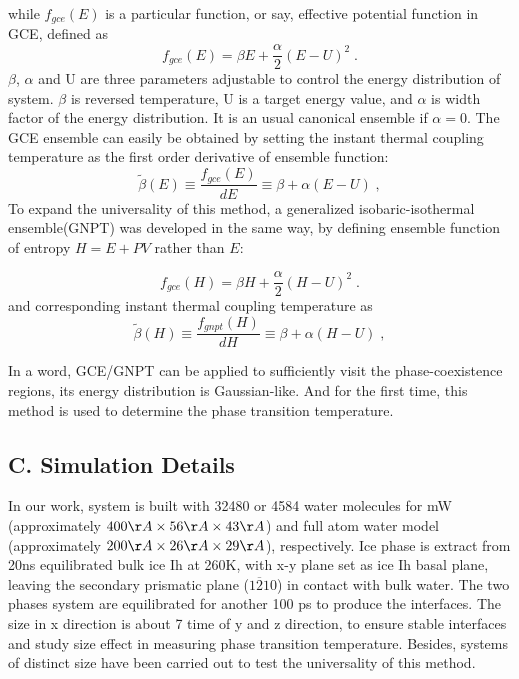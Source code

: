 \documentclass[aps,prl,twocolumn,superscriptaddress]{revtex4-1}
\begin{document}
while $f_{gce}(E)$ is a particular function, or say, effective potential function in GCE, defined as
\begin{equation}
f_{gce}(E)=\beta E+ \frac{\alpha}{2}(E−U)^2\;.
\end{equation}
$\beta$, $\alpha$ and U are three parameters adjustable to control the energy distribution of system. $\beta$ is reversed temperature, U is a target energy value, and $\alpha$  is width factor of the energy distribution. It is an usual canonical ensemble if $\alpha=0$. The GCE ensemble can easily be obtained by setting the instant thermal coupling temperature as the first order derivative of ensemble function:
\begin{equation}
\widetilde{\beta}(E)≡\frac{f_{gce}(E)}{dE}≡\beta+\alpha(E−U)\;,
\end{equation}
To expand the universality of this method, a generalized isobaric-isothermal ensemble(GNPT) was developed in the same way, by defining ensemble function of entropy $H=E+PV$ rather than $E$:

\begin{equation}
f_{gce}(H)=\beta H+ \frac{\alpha}{2}(H−U)^2\;.
\end{equation}
and corresponding instant thermal coupling temperature as
\begin{equation}
\widetilde{\beta}(H)≡\frac{f_{gnpt}(H)}{dH}≡\beta+\alpha(H−U)\;,
\end{equation}

In a word,  GCE/GNPT can be applied to sufficiently visit the phase-coexistence regions, its energy distribution is Gaussian-like\cite{Xu2012,Xu2015}. And for the first time, this method is used to determine the phase transition temperature.

\subsection{C. Simulation Details}
In our work, system is built with 32480 or 4584 water molecules for mW (approximately $400 \AA \times 56 \AA \times 43 \AA$) and full atom water model (approximately $200 \AA \times 26 \AA \times 29 \AA$), respectively. Ice phase is extract from 20ns equilibrated bulk ice Ih at 260K, with x-y plane set as ice Ih basal plane, leaving the secondary prismatic plane ($1\overline{2}10$) in contact with bulk water. The two phases system are equilibrated for another 100 ps to produce the interfaces. The size in x direction is about 7 time of y and z direction, to ensure stable interfaces and study size effect in measuring phase transition temperature. Besides, systems of distinct size have been carried out to test the universality of this method.
\end{document}
